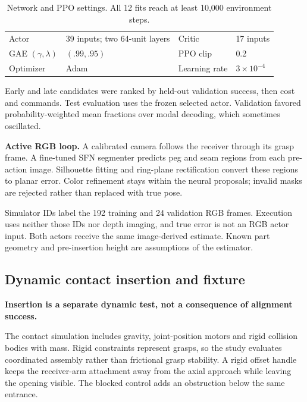 \documentclass{article}
\newcommand{\takeaway}[1]{\par\noindent\textcolor{teal!65!black}{\textbf{#1}}\par}
\begin{document}
\begin{table}[!ht]\centering
\caption{Network and PPO settings. All 12 fits reach at least 10,000 environment steps.}
\begin{tabularx}{\linewidth}{@{}lXlX@{}}\toprule
Actor & 39 inputs; two 64-unit layers & Critic & 17 inputs \\
GAE $(\gamma,\lambda)$ & $(.99,.95)$ & PPO clip & 0.2 \\
Optimizer & Adam & Learning rate & $3\times10^{-4}$ \\
\bottomrule\end{tabularx}
\end{table}

Early and late candidates were ranked by held-out validation success, then cost and commands. Test evaluation uses the frozen selected actor. Validation favored probability-weighted mean fractions over modal decoding, which sometimes oscillated.

\textbf{Active RGB loop.} A calibrated camera follows the receiver through its grasp frame. A fine-tuned SFN segmenter predicts peg and seam regions from each pre-action image. Silhouette fitting and ring-plane rectification convert these regions to planar error. Color refinement stays within the neural proposals; invalid masks are rejected rather than replaced with true pose.

Simulator IDs label the 192 training and 24 validation RGB frames. Execution uses neither those IDs nor depth imaging, and true error is not an RGB actor input. Both actors receive the same image-derived estimate. Known part geometry and pre-insertion height are assumptions of the estimator.

\clearpage
\subsection{Dynamic contact insertion and fixture}
\takeaway{Insertion is a separate dynamic test, not a consequence of alignment success.}
The contact simulation includes gravity, joint-position motors and rigid collision bodies with mass. Rigid constraints represent grasps, so the study evaluates coordinated assembly rather than frictional grasp stability. A rigid offset handle keeps the receiver-arm attachment away from the axial approach while leaving the opening visible. The blocked control adds an obstruction below the same entrance.
\end{document}
